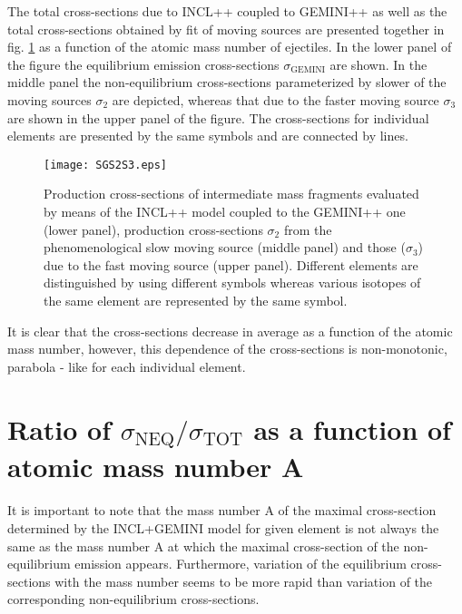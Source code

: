 The total cross-sections due to INCL++ \cite{INCLMancusi2014} coupled to
GEMINI++ \cite{CHARITY1988,Charity2010} as well as the total cross-sections
obtained by fit of moving sources are presented together in fig. \ref{fig:SGS2S3} as a function of the atomic mass number of
ejectiles. In the lower panel of the figure the equilibrium emission
cross-sections $\sigma_{\text{GEMINI}}$ are shown. In the middle
panel the non-equilibrium cross-sections parameterized by slower of
the moving sources $\sigma_2$ are depicted, whereas that due to the
faster moving source $\sigma_{3}$ are shown in the upper panel of
the figure.  The cross-sections for individual elements are
presented by the same symbols and are connected by lines.
%
\begin{figure}[!h]
	\centering
		\texttt{[image: SGS2S3.eps]}
	\caption{Production cross-sections of intermediate mass fragments evaluated by means of
		the INCL++ model coupled to the GEMINI++ one (lower panel),
		production cross-sections $\sigma_2$ from the phenomenological slow moving source (middle panel) and those
		($\sigma_3$) due to the fast moving source (upper panel).  Different elements are distinguished
		by using different symbols whereas  various isotopes
		of the same element are represented by the same symbol.}
	\label{fig:SGS2S3}
\end{figure}
%

It is clear that the cross-sections decrease in average as a
function of the atomic mass number, however, this dependence of the
cross-sections is non-monotonic, parabola - like  for each
individual element. 

\section{Ratio of $\sigma_{\text{NEQ}}/\sigma_{\text{TOT}}$ as a function of atomic mass number A}
It is important to note that the mass number A
of the maximal cross-section  determined by the INCL+GEMINI model
for given element is not always the same as the mass number A at
which the maximal cross-section of the non-equilibrium emission
appears. Furthermore, variation of the equilibrium cross-sections
with the mass number seems to be more rapid than variation of the
corresponding non-equilibrium cross-sections. 

